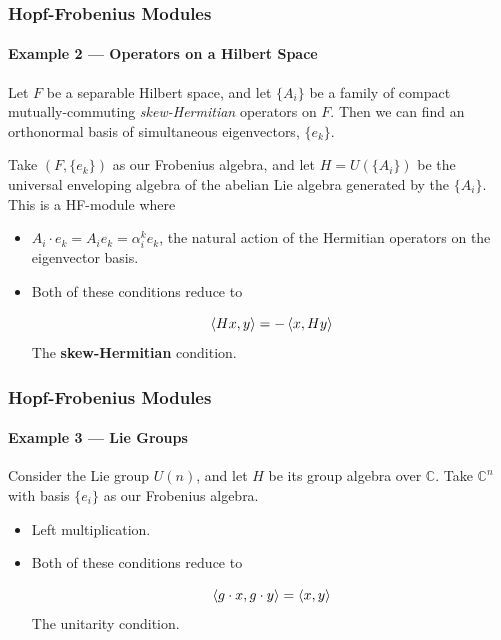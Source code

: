 \documentclass{beamer}
\begin{document}
\begin{frame}

\frametitle{Hopf-Frobenius Modules}
\framesubtitle{Example 2 --- Operators on a Hilbert Space}

Let $F$ be a separable Hilbert space, and let $\{ A_i \}$ be a family of compact mutually-commuting \textit{skew-Hermitian} operators on $F$. Then we can find an orthonormal basis of simultaneous eigenvectors, $\{ e_k \}$. 

Take $(F, \{ e_k \})$ as our Frobenius algebra, and let $H = U(\{ A_i \} )$ be the universal enveloping algebra of the abelian Lie algebra generated by the $\{ A_i \}$. This is a HF-module where


\begin{itemize}

\item {} $A_i \cdot e_k = A_i e_k = \alpha_{i}^k e_k$, the natural action of the Hermitian operators on the eigenvector basis.


\medskip

\item {} Both of these conditions reduce to

\begin{equation*}
\left\langle H x, y \right\rangle = - \left\langle x, Hy \right\rangle
\end{equation*}
The \textbf{skew-Hermitian} condition.
\end{itemize}



\end{frame}





\begin{frame}

\frametitle{Hopf-Frobenius Modules}
\framesubtitle{Example 3 --- Lie Groups}


Consider the Lie group $U(n)$, and let $H$ be its group algebra over $\mathbb{C}$. Take $\mathbb{C}^n$ with basis $\{ e_i \}$ as our Frobenius algebra.

\bigskip

\begin{itemize}

\item {} Left multiplication.


\medskip

\item {} Both of these conditions reduce to

\begin{equation*}
\left\langle g \cdot x, g \cdot y \right\rangle = \left\langle x,y \right\rangle
\end{equation*}
The unitarity condition.

\end{itemize}




\end{frame}
\end{document}
